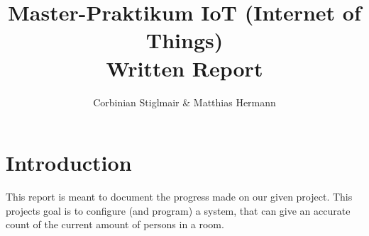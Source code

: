 \documentclass[]{article}
\title{Master-Praktikum IoT (Internet of Things)\\Written Report}
\author{Corbinian Stiglmair \& Matthias Hermann}
\begin{document}
\maketitle
\newpage
\tableofcontents
\newpage

\begin{sloppypar}
\section{Introduction}
This report is meant to document the progress made on our given project. This projects goal is to configure (and program) a system, that can give an accurate count of the current amount of persons in a room.
\newpage
\printbibliography

\end{sloppypar}
\end{document}
